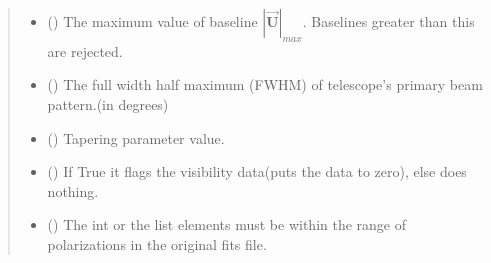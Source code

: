 \documentclass[a4paper,11pt,oneside,english,openany]{sphinxmanual}
\begin{document}
\begin{fulllineitems}
\begin{quote}
\begin{description}
\begin{itemize}
\begin{enumerate}
\item {} 
\sphinxAtStartPar
If \sphinxhyphen{}1 then leaves the data as is.

\item {} 
\sphinxAtStartPar
If \sphinxhyphen{}2 then simulates random gaussian noise visibilities for the baselines with mean \(\mu = 0\) and std \(\sigma = 1\).

\end{enumerate}


\item {} 
\sphinxAtStartPar
{} () \textendash{} The maximum value of baseline \(|\vec{\textbf{U}}|_{max}\). Baselines greater than this are rejected.

\item {} 
\sphinxAtStartPar
{} () \textendash{} The full width half maximum (FWHM) of telescope’s primary beam pattern.(in degrees)

\item {} 
\sphinxAtStartPar
{} () \textendash{} Tapering parameter value.

\item {} 
\sphinxAtStartPar
{} (\sphinxstyleliteralemphasis{\sphinxupquote{ (}}\sphinxstyleliteralemphasis{\sphinxupquote{)}}) \textendash{} If True it flags the visibility data(puts the data to zero), else does nothing.

\item {} 
\sphinxAtStartPar
{} () \textendash{} The int or the list elements must be within the range of polarizations in the original fits file.


\end{itemize}
\end{description}
\end{quote}
\end{fulllineitems}
\end{document}
